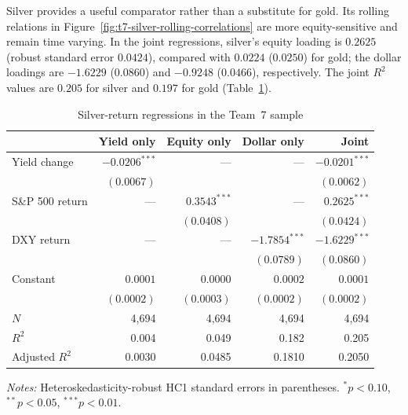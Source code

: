 Silver provides a useful comparator rather than a substitute for gold. Its
rolling relations in Figure~\ref{fig:t7-silver-rolling-correlations} are more
equity-sensitive and remain time varying. In the joint regressions, silver's
equity loading is $0.2625$ (robust standard error $0.0424$), compared with
$0.0224$ ($0.0250$) for gold; the dollar loadings are $-1.6229$ ($0.0860$)
and $-0.9248$ ($0.0466$), respectively. The joint $R^2$ values are $0.205$
for silver and $0.197$ for gold (Table~\ref{tab:t7-silver-ols}).

\begin{table}[htbp]
\centering
\caption{Silver-return regressions in the Team~7 sample}
\label{tab:t7-silver-ols}
\small
\begin{tabular}{lrrrr}
\toprule
 & Yield only & Equity only & Dollar only & Joint \\
\midrule
Yield change & $-0.0206^{***}$ & --- & --- & $-0.0201^{***}$ \\
             & $(0.0067)$      &     &     & $(0.0062)$       \\
S\&P 500 return & --- & $0.3543^{***}$ & --- & $0.2625^{***}$ \\
                &     & $(0.0408)$     &     & $(0.0424)$       \\
DXY return   & --- & --- & $-1.7854^{***}$ & $-1.6229^{***}$ \\
             &     &     & $(0.0789)$        & $(0.0860)$        \\
Constant     & $0.0001$ & $0.0000$ & $0.0002$ & $0.0001$ \\
             & $(0.0002)$& $(0.0003)$& $(0.0002)$& $(0.0002)$ \\
\midrule
$N$          & 4,694 & 4,694 & 4,694 & 4,694 \\
$R^2$        & 0.004 & 0.049 & 0.182 & 0.205 \\
Adjusted $R^2$ & 0.0030 & 0.0485 & 0.1810 & 0.2050 \\
\bottomrule
\end{tabular}
\begin{minipage}{0.92\textwidth}
\footnotesize\emph{Notes:} Heteroskedasticity-robust HC1 standard errors in
parentheses. $^{*}p<0.10$, $^{**}p<0.05$, $^{***}p<0.01$.
\end{minipage}
\end{table}

